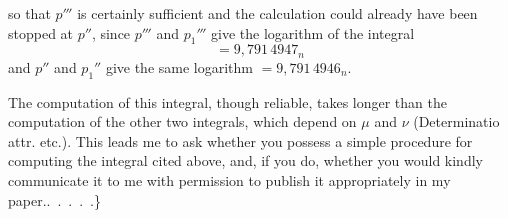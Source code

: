 so that \(p'''\) is certainly sufficient and the calculation could already have been stopped at \(p''\), since \(p'''\) and \(p_1'''\) give the logarithm of the integral
\[
=9{,}791\,4947_n
\]
and \(p''\) and \(p_1''\) give the same logarithm \(=9{,}791\,4946_n\).
\par The computation of this integral, though reliable, takes longer than the computation of the other two integrals, which depend on \(\mu\) and \(\nu\) (Determinatio attr. etc.). This leads me to ask whether you possess a simple procedure for computing the integral cited above, and, if you do, whether you would kindly communicate it to me with permission to publish it appropriately in my paper.\quad\mbox{. . . . .\}}
\par
